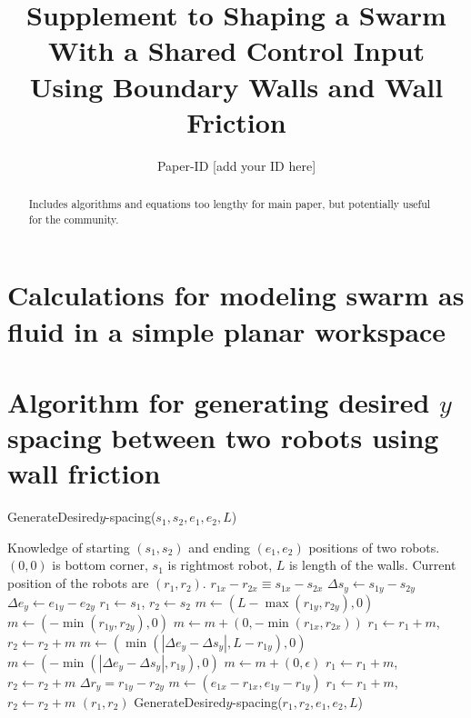 \documentclass[conference]{IEEEtran}
\begin{document}
\title{Supplement to
\large{Shaping a Swarm With a Shared Control Input\\ Using Boundary Walls and Wall Friction}}

\author{Paper-ID [add your ID here]}


\maketitle

\begin{abstract}
Includes algorithms and equations too lengthy for main paper, but potentially useful for the community.
\end{abstract}

\IEEEpeerreviewmaketitle

\section{ Calculations for modeling swarm as fluid in a simple planar workspace}


\section{ Algorithm for generating desired $y$ spacing between two robots using wall friction}
\begin{algorithm}
\caption{GenerateDesired$y$-spacing($s_1,s_2,e_1,e_2,L$)}\label{alg:YControl}
\begin{algorithmic}[1]
\Require Knowledge of starting $(s_1,s_2)$ and ending $(e_1,e_2)$ positions of  two robots. 
$(0,0)$ is bottom corner, $s_1$ is rightmost robot, 
 $L$ is length of the walls. Current position of the robots are $(r_1,r_2)$.
\Ensure   $ r_{1x} - r_{2x}  \equiv s_{1x} - s_{2x} $   %
\State $ \Delta s_y  \gets s_{1y} - s_{2y} $
\State $ \Delta e_y \gets e_{1y} - e_{2y} $
\State $ r_1 \gets s_1$, $ r_2 \gets s_2$
\State $ m \gets ( L-\max( r_{1y},r_{2y}) ,0)   $ 
\Else 
\State  $ m \gets ( -\min( r_{1y},r_{2y}),0 )    $ 
\EndIf
\State $m  \gets  m + (0, -\min( r_{1x},r_{2x} ))$ 
\State $ r_1 \gets r_1+m$, $ r_2 \gets r_2+m$ 
\State $ m \gets (\min(|\Delta e_y - \Delta s_y |, L- r_{1y}), 0)$  
\Else
\State $ m \gets (-\min(|\Delta e_y - \Delta s_y |, r_{1y}), 0)$
\EndIf 
\State $m  \gets  m + (0, \epsilon)$ 
\State $ r_1 \gets r_1+m$, $ r_2 \gets r_2+m$ 
\State $\Delta r_y = r_{1y} - r_{2y}$
\State   $ m \gets (e_{1x}-r_{1x}, e_{1y}-r_{1y})$
\State $ r_1 \gets r_1+m$, $ r_2 \gets r_2+m$ 
\State  \Return $(r_1,r_2)$
\Else   
\State \Return GenerateDesired$y$-spacing($r_1,r_2,e_1,e_2,L$)
\EndIf
\end{algorithmic}
\end{algorithm}



\end{document}
